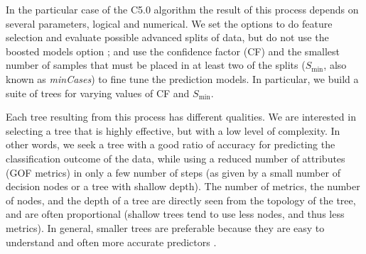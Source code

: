 In the particular case of the C5.0 algorithm the result of this process depends on several parameters, logical and numerical. We set the options to do feature selection and evaluate possible advanced splits of data, but do not use the boosted models option \citep[see][]{Kuhn_2017_Manual}; and use the confidence factor (CF) and the smallest number of samples that must be placed in at least two of the splits ($S_{\min}$, also known as \textit{minCases}) to fine tune the prediction models. In particular, we build a suite of trees for varying values of CF and $S_{\min}$.

Each tree resulting from this process has different qualities. We are interested in selecting a tree that is highly effective, but with a low level of complexity. In other words, we seek a tree with a good ratio of accuracy for predicting the classification outcome of the data, while using a reduced number of attributes (GOF metrics) in only a few number of steps (as given by a small number of decision nodes or a tree with shallow depth). The number of metrics, the number of nodes, and the depth of a tree are directly seen from the topology of the tree, and are often proportional (shallow trees tend to use less nodes, and thus less metrics). In general, smaller trees are preferable because they are easy to understand and often more accurate predictors \citep{Quinlan_1996_JAIR}.

